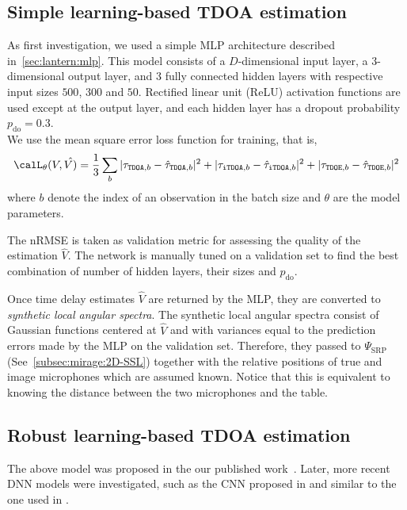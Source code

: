 \subsection{Simple learning-based TDOA estimation}
As first investigation, we used a simple \ac{MLP} architecture described in~\cref{sec:lantern:mlp}.
This model consists of a $D$-dimensional input layer, a 3-dimensional output layer, and 3 fully connected hidden layers with respective input sizes $500$, $300$ and $50$.
Rectified linear unit (ReLU) activation functions are used except at the output layer, and each hidden layer has a dropout probability $p_\text{do} = 0.3$.
\\We use the mean square error loss function for training, that is,
\begin{equation}\label{eq:mirage:mlploss}
    \calL_\theta(V, \hat{V)} = \frac{1}{3} \sum_{b}  \powerOf{\tau_{\mathtt{TDOA}, b} - \hat{\tau}_{\mathtt{TDOA}, b}}
                                            + \powerOf{\tau_{\mathtt{iTDOA}, b} - \hat{\tau}_{\mathtt{iTDOA}, b}}
                                            + \powerOf{\tau_{\mathtt{TDOE}, b} - \hat{\tau}_{\mathtt{TDOE}, b}}
\end{equation}
where $b$ denote the index of an observation in the batch size and $\theta$ are the model parameters.

\mynewline
The \acf{nRMSE} is taken as validation metric for assessing the quality of the estimation $\hat{V}$.
The network is manually tuned on a validation set to find the best combination of number of hidden layers, their sizes and $p_\text{do}$.

\mynewline
Once time delay estimates $\hat{V}$ are returned by the \ac{MLP}, they are converted to \textit{synthetic local angular spectra}.
The synthetic local angular spectra consist of Gaussian functions centered at $\hat{V}$ and with variances equal to the prediction errors made by the \ac{MLP} on the validation set.
Therefore, they passed to $\Psi_\text{SRP}$ (See~\cref{subsec:mirage:2D-SSL}) together with the relative positions of true and image microphones which are assumed known.
Notice that this is equivalent to knowing the distance between the two microphones and the table.

\subsection{Robust learning-based TDOA estimation}
The above model was proposed in the our published work~.
Later, more recent \ac{DNN} models were investigated, such as the \ac{CNN} proposed in  and similar to the one used in .

